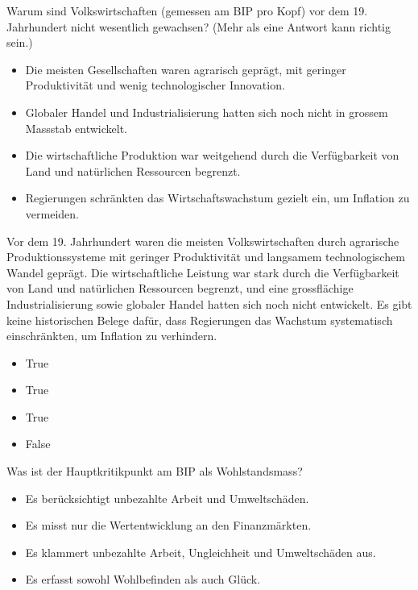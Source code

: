 \documentclass[
  nswissgerman,
  a4paper,
  DIV=11,
  numbers=noendperiod,
  oneside,
  openany]{scrreprt}
\providecommand{\tightlist}{%
  \setlength{\itemsep}{0pt}\setlength{\parskip}{0pt}}
\begin{document}
Warum sind Volkswirtschaften (gemessen am BIP pro Kopf) vor dem 19.
Jahrhundert nicht wesentlich gewachsen? (Mehr als eine Antwort kann
richtig sein.)

\begin{itemize}
\tightlist
\item[$\square$]
  Die meisten Gesellschaften waren agrarisch geprägt, mit geringer
  Produktivität und wenig technologischer Innovation.
\item[$\square$]
  Globaler Handel und Industrialisierung hatten sich noch nicht in
  grossem Massstab entwickelt.
\item[$\square$]
  Die wirtschaftliche Produktion war weitgehend durch die Verfügbarkeit
  von Land und natürlichen Ressourcen begrenzt.
\item[$\square$]
  Regierungen schränkten das Wirtschaftswachstum gezielt ein, um
  Inflation zu vermeiden.
\end{itemize}

Vor dem 19. Jahrhundert waren die meisten Volkswirtschaften durch
agrarische Produktionssysteme mit geringer Produktivität und langsamem
technologischem Wandel geprägt. Die wirtschaftliche Leistung war stark
durch die Verfügbarkeit von Land und natürlichen Ressourcen begrenzt,
und eine grossflächige Industrialisierung sowie globaler Handel hatten
sich noch nicht entwickelt. Es gibt keine historischen Belege dafür,
dass Regierungen das Wachstum systematisch einschränkten, um Inflation
zu verhindern.

\begin{itemize}
\tightlist
\item
  True
\item
  True
\item
  True
\item
  False
\end{itemize}

Was ist der Hauptkritikpunkt am BIP als Wohlstandsmass?

\begin{itemize}
\tightlist
\item[$\square$]
  Es berücksichtigt unbezahlte Arbeit und Umweltschäden.
\item[$\square$]
  Es misst nur die Wertentwicklung an den Finanzmärkten.
\item[$\square$]
  Es klammert unbezahlte Arbeit, Ungleichheit und Umweltschäden aus.
\item[$\square$]
  Es erfasst sowohl Wohlbefinden als auch Glück.
\end{itemize}
\end{document}
